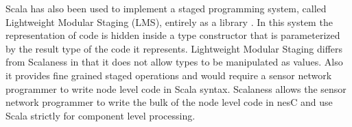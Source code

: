 %
%


Scala has also been used to implement a staged programming system, called Lightweight Modular
Staging (LMS), entirely as a library \cite{Rompf-LMS}. In this system the representation of code
is hidden inside a type constructor that is parameterized by the result type of the code it
represents. Lightweight Modular Staging differs from Scalaness in that it does not allow types
to be manipulated as values. Also it provides fine grained staged operations and would require a
sensor network programmer to write node level code in Scala syntax. Scalaness allows the sensor
network programmer to write the bulk of the node level code in nesC and use Scala strictly for
component level processing.
